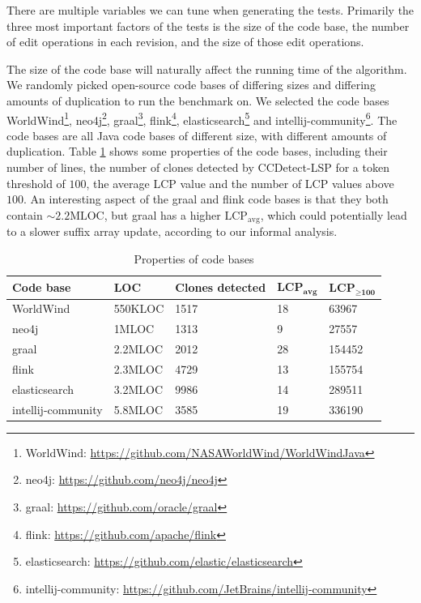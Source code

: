 There are multiple variables we can tune when generating the tests. Primarily the three
most important factors of the tests is the size of the code base, the number of edit
operations in each revision, and the size of those edit operations.

The size of the code base will naturally affect the running time of the algorithm. We
randomly picked open-source code bases of differing sizes and differing amounts of
duplication to run the benchmark on. We selected the code bases
WorldWind\footnote{WorldWind: \url{https://github.com/NASAWorldWind/WorldWindJava}},
neo4j\footnote{neo4j: \url{https://github.com/neo4j/neo4j}}, graal\footnote{graal:
\url{https://github.com/oracle/graal}}, flink\footnote{flink:
\url{https://github.com/apache/flink}}, elasticsearch\footnote{elasticsearch:
\url{https://github.com/elastic/elasticsearch}} and
intellij-community\footnote{intellij-community:
\url{https://github.com/JetBrains/intellij-community}}. The code bases are all Java code
bases of different size, with different amounts of duplication. Table \ref{tab:codebases}
shows some properties of the code bases, including their number of lines, the number of
clones detected by CCDetect-LSP for a token threshold of $100$, the average LCP value and
the number of LCP values above $100$. An interesting aspect of the graal and flink code
bases is that they both contain ${\sim}2.2\text{MLOC}$, but graal has a higher
$\text{LCP}_\text{avg}$, which could potentially lead to a slower suffix array update,
according to our informal analysis.

\begin{table}[t]
    \begin{center}
        \begin{tabular}[c]{|l|l|l|l|l|}
            \hline
            \textbf{Code base} & \textbf{LOC} & \textbf{Clones detected} &
            $\textbf{LCP}_{\textbf{avg}}$ & $\textbf{LCP}_{\geq \textbf{100}}$ \\
            \hline
            WorldWind & 550KLOC & 1517 & 18 & 63967\\
            \hline
            neo4j & 1MLOC & 1313 & 9 & 27557\\
            \hline
            graal & 2.2MLOC & 2012 & 28 & 154452\\
            \hline
            flink & 2.3MLOC & 4729 & 13 & 155754\\
            \hline
            elasticsearch & 3.2MLOC & 9986 & 14 & 289511 \\
            \hline
            intellij-community & 5.8MLOC & 3585 & 19 & 336190 \\
            \hline
        \end{tabular}
    \end{center}
    \caption{Properties of code bases}
    \label{tab:codebases}
\end{table}

